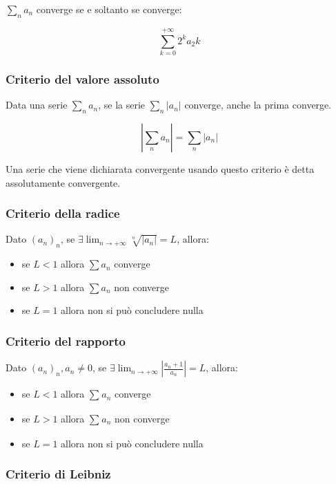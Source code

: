 \documentclass{article}
\begin{document}
$\sum_{n} a_n$ converge se e soltanto se converge:

$$
\sum_{k = 0}^{+\infty} 2^k a_2k
$$

\subsubsection{Criterio del valore assoluto}

Data una serie $\sum_{n}a_n$, se la serie $\sum_{n}|a_n|$ converge, anche la prima converge.

$$
|\sum_{n}a_n| = \sum_{n}|a_n|
$$

\noindent
Una serie che viene dichiarata convergente usando questo criterio è detta assolutamente convergente.

\subsubsection{Criterio della radice}

Dato $(a_n)_n$, se $\exists \lim_{n \to +\infty} \sqrt[n]{|a_n|} = L$, allora:

\begin{itemize}
    \item se $L < 1$ allora $\sum a_n$ converge
    \item se $L > 1$ allora $\sum a_n$ non converge
    \item se $L = 1$ allora non si può concludere nulla
\end{itemize}

\subsubsection{Criterio del rapporto}

Dato $(a_n)_n, a_n \neq 0$, se $\exists \lim_{n \to +\infty} |\frac{a_n + 1}{a_n}| = L$, allora:

\begin{itemize}
    \item se $L < 1$ allora $\sum_{}^{} a_n$ converge
    \item se $L > 1$ allora $\sum_{}^{} a_n$ non converge
    \item se $L = 1$ allora non si può concludere nulla
\end{itemize}

\subsubsection{Criterio di Leibniz}
\end{document}

